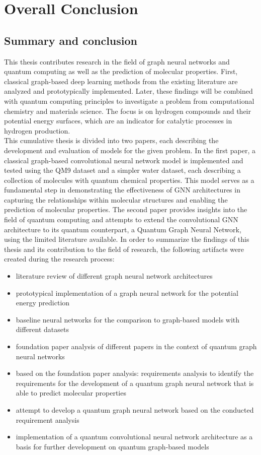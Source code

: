 \chapter{Overall Conclusion}
\label{global:conlusion}
\section{Summary and conclusion}
This thesis contributes research in the field of graph neural networks and quantum computing as well as the prediction of molecular properties. First, classical graph-based deep learning methods from the existing literature are analyzed and prototypically implemented. Later, these findings will be combined with quantum computing principles to investigate a problem from computational chemistry and materials science. The focus is on hydrogen compounds and their potential energy surfaces, which are an indicator for catalytic processes in hydrogen production. \\ 

This cumulative thesis is divided into two papers, each describing the development and evaluation of models for the given problem. In the first paper, a classical graph-based convolutional neural network model is implemented and tested using the QM9 dataset and a simpler water dataset, each describing a collection of molecules with quantum chemical properties. This model serves as a fundamental step in demonstrating the effectiveness of GNN architectures in capturing the relationships within molecular structures and enabling the prediction of molecular properties. The second paper provides insights into the field of quantum computing and attempts to extend the convolutional GNN architecture to its quantum counterpart, a Quantum Graph Neural Network, using the limited literature available.
In order to summarize the findings of this thesis and its contribution to the field of research, the following artifacts were created during the research process:

\begin{itemize}
    \item literature review of different graph neural network architectures
    \item prototypical implementation of a graph neural network for the potential energy prediction
    \item baseline neural networks for the comparison to graph-based models with different datasets
    \item foundation paper analysis of different papers in the context of quantum graph neural networks
    \item based on the foundation paper analysis: requirements analysis to identify the requirements for the development of a quantum graph neural network that is able to predict molecular properties 
    \item attempt to develop a quantum graph neural network based on the conducted requirement analysis
    \item implementation of a quantum convolutional neural network architecture as a basis for further development on quantum graph-based models
\end{itemize} 

